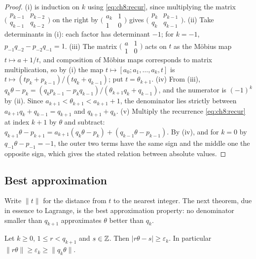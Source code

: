 \begin{proof}
(i) is induction on $k$ using \eqref{eq:ch8:recur}, since multiplying the
matrix
$\bigl(\begin{smallmatrix}p_{k-1}&p_{k-2}\\q_{k-1}&q_{k-2}\end{smallmatrix}\bigr)$
on the right by
$\bigl(\begin{smallmatrix}a_k&1\\1&0\end{smallmatrix}\bigr)$ gives
$\bigl(\begin{smallmatrix}p_k&p_{k-1}\\q_k&q_{k-1}\end{smallmatrix}\bigr)$.
(ii) Take determinants in (i): each factor has determinant $-1$; for $k=-1$,
$p_{-1}q_{-2}-p_{-2}q_{-1}=1$.
(iii) The matrix
$\bigl(\begin{smallmatrix}a&1\\1&0\end{smallmatrix}\bigr)$ acts on $t$ as the
M\"obius map $t\mapsto a+1/t$, and composition of M\"obius maps corresponds to
matrix multiplication, so by (i) the map
$t\mapsto[a_0;a_1,\dots,a_k,t]$ is
$t\mapsto(tp_k+p_{k-1})/(tq_k+q_{k-1})$; put $t=\theta_{k+1}$.
(iv) From (iii),
$q_k\theta-p_k=(q_kp_{k-1}-p_kq_{k-1})/(\theta_{k+1}q_k+q_{k-1})$, and the
numerator is $(-1)^k$ by (ii). Since $a_{k+1}<\theta_{k+1}<a_{k+1}+1$, the
denominator lies strictly between $a_{k+1}q_k+q_{k-1}=q_{k+1}$ and
$q_{k+1}+q_k$.
(v) Multiply the recurrence \eqref{eq:ch8:recur} at index $k+1$ by $\theta$
and subtract: $q_{k+1}\theta-p_{k+1}=a_{k+1}(q_k\theta-p_k)+
(q_{k-1}\theta-p_{k-1})$. By (iv), and for $k=0$ by $q_{-1}\theta-p_{-1}=-1$,
the outer two terms have the same sign and the middle one the opposite sign,
which gives the stated relation between absolute values.
\end{proof}

\subsection{Best approximation}

Write $\|t\|$ for the distance from $t$ to the nearest integer. The next
theorem, due in essence to Lagrange, is the best approximation property: no
denominator smaller than $q_{k+1}$ approximates $\theta$ better than $q_k$.

\begin{theorem}\label{thm:ch8:best}
Let $k\geq0$, $1\leq r<q_{k+1}$ and $s\in\mathbb{Z}$. Then
$|r\theta-s|\geq\varepsilon_k$. In particular $\|r\theta\|\geq\varepsilon_k
\geq\|q_k\theta\|$.
\end{theorem}

